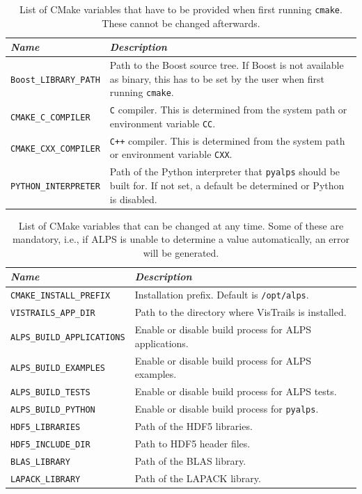 \documentclass[12pt]{iopart}
\begin{document}
\begin{table}
\centering
\begin{tabular}{l|p{10cm}}
\hline 
{\it Name} &{\it Description} \\ \hline
{\tt Boost\_LIBRARY\_PATH} &Path to the Boost source tree. If Boost is not available as binary, this has to be set by the user when first running {\tt cmake}. \\ \hline
{\tt CMAKE\_C\_COMPILER} &{\tt C} compiler. This is determined from the system path or environment variable {\tt CC}. \\ \hline
{\tt CMAKE\_CXX\_COMPILER} &{\tt C++} compiler. This is determined from the system path or environment variable {\tt CXX}. \\ \hline
{\tt PYTHON\_INTERPRETER} &Path of the Python interpreter that {\tt pyalps} should be built for. If not set, a default be determined or Python is disabled. \\ \hline
\end{tabular}
\caption{List of CMake variables that have to be provided when first running {\tt cmake}. These cannot be changed afterwards. \label{table:cmake_variables}}
\end{table}

\begin{table}
\centering
\begin{tabular}{l|p{10cm}}
\hline
{\it Name} &{\it Description} \\ \hline
{\tt CMAKE\_INSTALL\_PREFIX} &Installation prefix. Default is {\tt /opt/alps}. \\ \hline
{\tt VISTRAILS\_APP\_DIR} &Path to the directory where VisTrails is installed. \\ \hline
{\tt ALPS\_BUILD\_APPLICATIONS} &Enable or disable build process for ALPS applications. \\ \hline
{\tt ALPS\_BUILD\_EXAMPLES} &Enable or disable build process for ALPS examples. \\ \hline
{\tt ALPS\_BUILD\_TESTS} &Enable or disable build process for ALPS tests. \\ \hline
{\tt ALPS\_BUILD\_PYTHON} &Enable or disable build process for {\tt pyalps}. \\ \hline
{\tt HDF5\_LIBRARIES} &Path of the HDF5 libraries. \\ \hline
{\tt HDF5\_INCLUDE\_DIR} &Path to HDF5 header files. \\ \hline
{\tt BLAS\_LIBRARY} &Path of the BLAS library. \\ \hline
{\tt LAPACK\_LIBRARY} &Path of the LAPACK library. \\ \hline
\end{tabular}
\caption{List of CMake variables that can be changed at any time. Some of these are mandatory, i.e., if ALPS is unable to determine a value automatically, an error will be generated. \label{table:cmake_variables2}}
\end{table}
\end{document}
